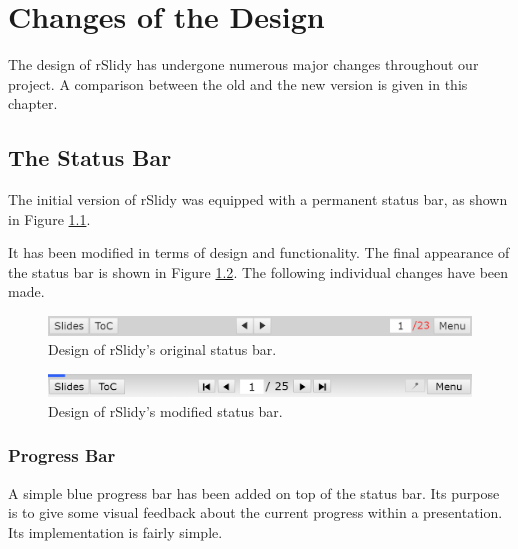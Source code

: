 %
%
% 
% 
% 


\chapter{Changes of the Design}

\label{chap:design}

The design of rSlidy has undergone numerous major changes throughout our project. A comparison between the old and the new version is given in this chapter.

\section{The Status Bar}
The initial version of rSlidy was equipped with a permanent status bar, as shown in Figure \ref{fig:statusbarOLD}.

It has been modified in terms of design and functionality. The final appearance of the status bar is shown in  Figure \ref{fig:statusbarNEW}. The following individual changes have been made.

\begin{figure}[tp]
	\centering
	\includegraphics[width = \textwidth]{images/status_bar_old.png}
	
	\caption[Original Status Bar]{
		Design of rSlidy's original status bar.
	}
	\label{fig:statusbarOLD}
\end{figure}

\begin{figure}[tp]
	\centering
	\includegraphics[width = \textwidth]{images/status_bar_NEW.png}
	
	\caption[Modified Status Bar]{
		Design of rSlidy's modified status bar.
	}
	\label{fig:statusbarNEW}
\end{figure}


\subsection{Progress Bar}
A simple blue progress bar has been added on top of the status bar. Its purpose is to give some visual feedback about the current progress within a presentation. Its implementation is fairly simple.

